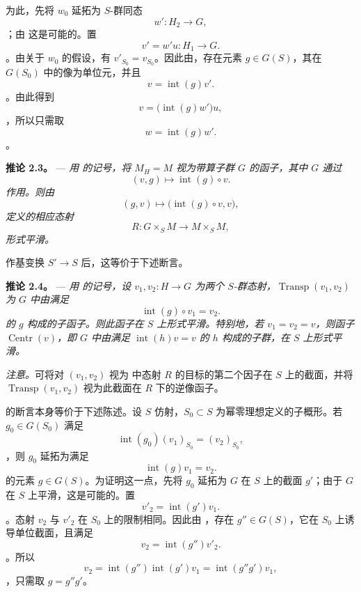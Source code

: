 为此，先将 \(w_0\) 延拓为 \(S\)-群同态 \[
  w':H_2\longrightarrow G,
\]；由  这是可能的。置 \[
  v'=w'u:H_1\longrightarrow G.
\]。由关于 \(w_0\) 的假设，有 \(v'_{S_0}=v_{S_0}\)。因此由，存在元素 \(g\in G(S)\)，其在 \(G(S_0)\) 中的像为单位元，并且 \[
  v=\operatorname{int}(g)v'.
\]。由此得到 \[
  v=\bigl(\operatorname{int}(g)w'\bigr)u,
\]，所以只需取 \[
  w=\operatorname{int}(g)w'.
\]。

\medskip\noindent{}\textbf{推论 2.3。} --- \textit{用  的记号，将 \(M_H=M\) 视为带算子群 \(G\) 的函子，其中 \(G\) 通过 \[
  (v,g)\longmapsto\operatorname{int}(g)\circ v.
\] 作用。则由 \[
  (g,v)\longmapsto\bigl(\operatorname{int}(g)\circ v,v\bigr),
\] 定义的相应态射}  \[
  R:G\times_S M\longrightarrow M\times_S M,
\]\textit{形式平滑。}

作基变换 \(S'\to S\) 后，这等价于下述断言。

\medskip\noindent{}\textbf{推论 2.4。} --- \textit{用  的记号，设 \(v_1,v_2:H\to G\) 为两个 \(S\)-群态射，\(\operatorname{Transp}(v_1,v_2)\) 为 \(G\) 中由满足 \[
  \operatorname{int}(g)\circ v_1=v_2.
\] 的 \(g\) 构成的子函子。则此函子在 \(S\) 上形式平滑。特别地，若 \(v_1=v_2=v\)，则函子 \(\operatorname{Centr}(v)\)，即 \(G\) 中由满足 \(\operatorname{int}(h)v=v\) 的 \(h\) 构成的子群，在 \(S\) 上形式平滑。}

\emph{注意。}可将对 \((v_1,v_2)\) 视为  中态射 \(R\) 的目标的第二个因子在 \(S\) 上的截面，并将 \(\operatorname{Transp}(v_1,v_2)\) 视为此截面在 \(R\) 下的逆像函子。

 的断言本身等价于下述陈述。设 \(S\) 仿射，\(S_0\subset S\) 为幂零理想定义的子概形。若 \(g_0\in G(S_0)\) 满足 \[
  \operatorname{int}(g_0)(v_1)_{S_0}=(v_2)_{S_0},
\]，则 \(g_0\) 延拓为满足 \[
  \operatorname{int}(g)v_1=v_2.
\] 的元素 \(g\in G(S)\)。为证明这一点，先将 \(g_0\) 延拓为 \(G\) 在 \(S\) 上的截面 \(g'\)；由于 \(G\) 在 \(S\) 上平滑，这是可能的。置 \[
  v'_2=\operatorname{int}(g')v_1.
\]。态射 \(v_2\) 与 \(v'_2\) 在 \(S_0\) 上的限制相同。因此由 ，存在 \(g''\in G(S)\)，它在 \(S_0\) 上诱导单位截面，且满足 \[
  v_2=\operatorname{int}(g'')v'_2.
\]。所以 \[
  v_2
  =\operatorname{int}(g'')\operatorname{int}(g')v_1
  =\operatorname{int}(g''g')v_1,
\]，只需取 \(g=g''g'\)。

